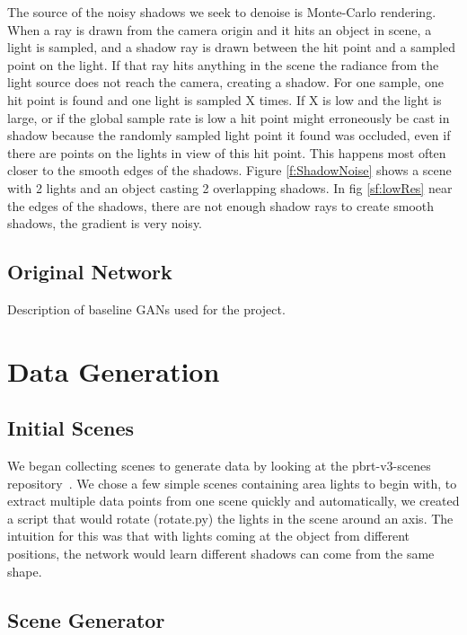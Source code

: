 \documentclass[acmsmall]{acmart}
\begin{document}
The source of the noisy shadows we seek to denoise is Monte-Carlo rendering. When a ray is drawn from the camera origin and it hits an object in scene, a light is sampled, and a shadow ray is drawn between the hit point and a sampled point on the light. If that ray hits anything in the scene the radiance from the light source does not reach the camera, creating a shadow. For one sample, one hit point is found and one light is sampled X times. If X is low and the light is large, or if the global sample rate is low a hit point might erroneously be cast in shadow because the randomly sampled light point it found was occluded, even if there are points on the lights in view of this hit point. This happens most often closer to the smooth edges of the shadows. Figure \ref{f:ShadowNoise} shows a scene with 2 lights and an object casting 2 overlapping shadows. In fig \ref{sf:lowRes} near the edges of the shadows, there are not enough shadow rays to create smooth shadows, the gradient is very noisy.

\subsection{Original Network}

Description of baseline GANs used for the project.

\section{Data Generation}
\label{sec:datagen}

\subsection{Initial Scenes}
\label{subsec:initScenes}

We began collecting scenes to generate data by looking at the pbrt-v3-scenes repository~\cite{scenes}. We chose a few simple scenes containing area lights to begin with, to extract multiple data points from one scene quickly and automatically, we created a script that would rotate (rotate.py) the lights in the scene around an axis. The intuition for this was that with lights coming at the object from different positions, the network would learn different shadows can come from the same shape.

\subsection{Scene Generator}
\label{subsec:sceneGen}
\end{document}
